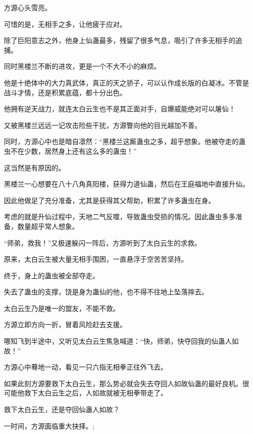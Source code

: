 \begin{this_body}
方源心头雪亮。

可惜的是，无相手之多，让他疲于应对。

除了巨阳意志之外，他身上仙蛊最多，残留了很多气息，吸引了许多无相手的追捕。

同时黑楼兰不断的进攻，更是一个不大不小的麻烦。

他是十绝体中的大力真武体，真正的天之骄子，可以认作成长版的白凝冰。不管是战斗才情，还是积累底蕴，都十分出色。

他拥有逆天战力，就连太白云生也不是其正面对手，自爆威能绝对可以屠仙！

又被黑楼兰远远一记攻击险些干扰，方源瞥向他的目光越加不善。

同时，方源心中也是暗自凛然：“黑楼兰这厮蛊虫之多，超乎想象。他被夺走的蛊虫不在少数，居然身上还有这么多的蛊虫！”

这当然是有原因的。

黑楼兰一心想要在八十八角真阳楼，获得力道仙蛊，然后在王庭福地中直接升仙。

因此他做足了充分准备，尤其是获得其父帮助，积累了许多蛊虫在身。

考虑的就是升仙过程中，天地二气反噬，导致蛊虫受损的情况。因此蛊虫多多准备，数量超乎常人想象。

“师弟，救我！”又极速躲闪一阵后，方源听到了太白云生的求救。

原来，太白云生被大量无相手围困，一直悬浮于空苦苦坚持。

终于，身上的蛊虫被全部夺走。

失去了蛊虫的支撑，饶是身为蛊仙的他，也不得不往地上坠落摔去。

太白云生乃是唯一的盟友，不能不救。

方源立即方向一折，冒着风险赶去支援。

哪知飞到半途中，又听见太白云生焦急喊道：“快，师弟，快夺回我的仙蛊人如故！”

方源心中蓦地一动，看见一只六指无相拳正往外飞去。

如果此刻方源要救下太白云生，那么势必就会失去夺回人如故仙蛊的最好良机。很可能他救下太白云生之后，人如故就被无相拳带走了。

救下太白云生，还是夺回仙蛊人如故？

一时间，方源面临重大抉择。;

\end{this_body}


